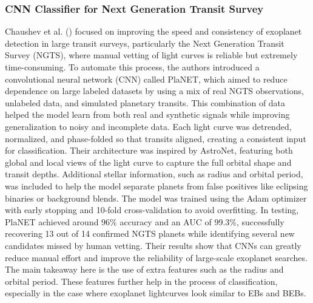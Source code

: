 \documentclass[letterpaper]{article} %
\begin{document}
\subsubsection{CNN Classifier for Next Generation Transit Survey}
Chaushev et al. (\citeyear{Chaushev2019ngts}) focused on improving the speed and consistency of exoplanet detection in large transit surveys, particularly the Next Generation Transit Survey (NGTS), where manual vetting of light curves is reliable but extremely time-consuming. To automate this process, the authors introduced a convolutional neural network (CNN) called PlaNET, which aimed to reduce dependence on large labeled datasets by using a mix of real NGTS observations, unlabeled data, and simulated planetary transits. This combination of data helped the model learn from both real and synthetic signals while improving generalization to noisy and incomplete data. Each light curve was detrended, normalized, and phase-folded so that transits aligned, creating a consistent input for classification. Their architecture was inspired by AstroNet, featuring both global and local views of the light curve to capture the full orbital shape and transit depths. Additional stellar information, such as radius and orbital period, was included to help the model separate planets from false positives like eclipsing binaries or background blends. The model was trained using the Adam optimizer with early stopping and 10-fold cross-validation to avoid overfitting. In testing, PlaNET achieved around 96\% accuracy and an AUC of 99.3\%, successfully recovering 13 out of 14 confirmed NGTS planets while identifying several new candidates missed by human vetting. Their results show that CNNs can greatly reduce manual effort and improve the reliability of large-scale exoplanet searches. The main takeaway here is the use of extra features such as the radius and orbital period. These features further help in the process of classification, especially in the case where exoplanet lightcurves look similar to EBs and BEBs.
\end{document}
